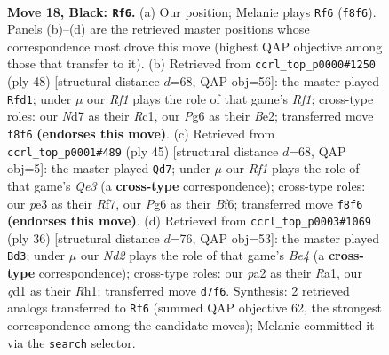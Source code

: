 \documentclass[11pt]{article}
\begin{document}
\clearpage

\begin{figure}[p]\centering
\begin{subfigure}{0.46\textwidth}\centering
\resizebox{\linewidth}{!}{%
\newchessgame
\chessboard[
  setfen={r1b2rk1/pp1n3p/2pq2p1/3p2p1/3P4/2NBPPP1/PP5P/2RQR1K1 b - - 0 18},
  showmover=false,
  pgfstyle=straightmove, color=movearrow, markmove={f8-f6}
]}
\caption{}
\end{subfigure}\hfill
\begin{subfigure}{0.46\textwidth}\centering
\resizebox{\linewidth}{!}{%
\newchessgame
\chessboard[
  setfen={rqr3k1/5pp1/1pbppn1p/8/1PP1P3/2N2P1P/3QB1P1/2R2RK1 w - - 5 25},
  showmover=false,
  pgfstyle=straightmove, color=movearrow, markmove={f1-d1}
]}
\caption{}
\end{subfigure}
\\[4pt]
\begin{subfigure}{0.46\textwidth}\centering
\resizebox{\linewidth}{!}{%
\newchessgame
\chessboard[
  setfen={1r4k1/5rpp/3pqb2/1pp1np2/4pN1P/1P2P1P1/P3BP2/1R1Q1RK1 b - - 1 23},
  showmover=false,
  pgfstyle=straightmove, color=movearrow, markmove={e6-d7}
]}
\caption{}
\end{subfigure}\hfill
\begin{subfigure}{0.46\textwidth}\centering
\resizebox{\linewidth}{!}{%
\newchessgame
\chessboard[
  setfen={2bqk2r/r4pp1/n2p3p/pp1Pp3/4B1PP/PN2PQ2/1PP1K3/R6R w k - 2 19},
  showmover=false,
  pgfstyle=straightmove, color=movearrow, markmove={e4-d3}
]}
\caption{}
\end{subfigure}
\caption{\textbf{Move 18, Black: \texttt{Rf6}.} (a) Our position; Melanie plays \texttt{Rf6} (\texttt{f8f6}). Panels (b)--(d) are the retrieved master positions whose correspondence most drove this move (highest QAP objective among those that transfer to it). (b) Retrieved from \texttt{ccrl\_top\_p0000\#1250} (ply 48) [structural distance $d$=68, QAP obj=56]: the master played \texttt{Rfd1}; under $\mu$ our \emph{Rf1} plays the role of that game's \emph{Rf1}; cross-type roles: our \emph{N}d7 as their \emph{R}c1, our \emph{P}g6 as their \emph{B}e2; transferred move \texttt{f8f6} \textbf{(endorses this move)}. (c) Retrieved from \texttt{ccrl\_top\_p0001\#489} (ply 45) [structural distance $d$=68, QAP obj=5]: the master played \texttt{Qd7}; under $\mu$ our \emph{Rf1} plays the role of that game's \emph{Qe3} (a \textbf{cross-type} correspondence); cross-type roles: our \emph{p}e3 as their \emph{R}f7, our \emph{P}g6 as their \emph{B}f6; transferred move \texttt{f8f6} \textbf{(endorses this move)}. (d) Retrieved from \texttt{ccrl\_top\_p0003\#1069} (ply 36) [structural distance $d$=76, QAP obj=53]: the master played \texttt{Bd3}; under $\mu$ our \emph{Nd2} plays the role of that game's \emph{Be4} (a \textbf{cross-type} correspondence); cross-type roles: our \emph{p}a2 as their \emph{R}a1, our \emph{q}d1 as their \emph{R}h1; transferred move \texttt{d7f6}. Synthesis: 2 retrieved analogs transferred to \texttt{Rf6} (summed QAP objective 62, the strongest correspondence among the candidate moves); Melanie committed it via the \texttt{search} selector.}
\label{fig:thought-m35}
\end{figure}
\end{document}
